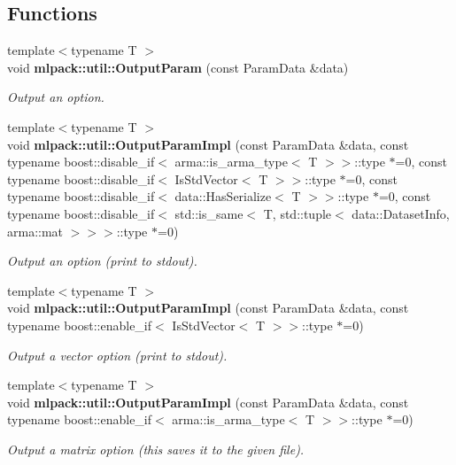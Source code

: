 \subsection*{Functions}
\begin{DoxyCompactItemize}
\item 
{\footnotesize template$<$typename T $>$ }\\void {\bf mlpack\+::util\+::\+Output\+Param} (const Param\+Data \&data)
\begin{DoxyCompactList}\small\item\em Output an option. \end{DoxyCompactList}\item 
{\footnotesize template$<$typename T $>$ }\\void {\bf mlpack\+::util\+::\+Output\+Param\+Impl} (const Param\+Data \&data, const typename boost\+::disable\+\_\+if$<$ arma\+::is\+\_\+arma\+\_\+type$<$ T $>$$>$\+::type $\ast$=0, const typename boost\+::disable\+\_\+if$<$ Is\+Std\+Vector$<$ T $>$$>$\+::type $\ast$=0, const typename boost\+::disable\+\_\+if$<$ data\+::\+Has\+Serialize$<$ T $>$$>$\+::type $\ast$=0, const typename boost\+::disable\+\_\+if$<$ std\+::is\+\_\+same$<$ T, std\+::tuple$<$ data\+::\+Dataset\+Info, arma\+::mat $>$$>$$>$\+::type $\ast$=0)
\begin{DoxyCompactList}\small\item\em Output an option (print to stdout). \end{DoxyCompactList}\item 
{\footnotesize template$<$typename T $>$ }\\void {\bf mlpack\+::util\+::\+Output\+Param\+Impl} (const Param\+Data \&data, const typename boost\+::enable\+\_\+if$<$ Is\+Std\+Vector$<$ T $>$$>$\+::type $\ast$=0)
\begin{DoxyCompactList}\small\item\em Output a vector option (print to stdout). \end{DoxyCompactList}\item 
{\footnotesize template$<$typename T $>$ }\\void {\bf mlpack\+::util\+::\+Output\+Param\+Impl} (const Param\+Data \&data, const typename boost\+::enable\+\_\+if$<$ arma\+::is\+\_\+arma\+\_\+type$<$ T $>$$>$\+::type $\ast$=0)
\begin{DoxyCompactList}\small\item\em Output a matrix option (this saves it to the given file). \end{DoxyCompactList}\item 
$$
\end{DoxyCompactItemize}
